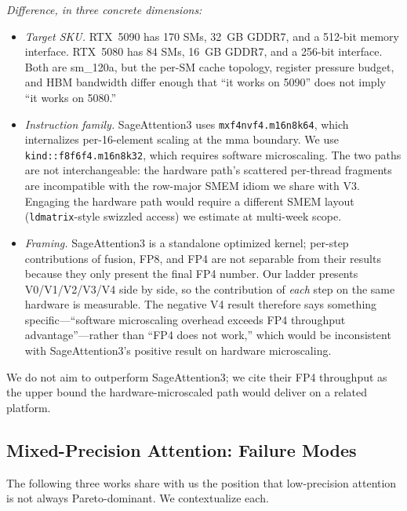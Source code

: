 \documentclass[conference]{IEEEtran}
\begin{document}
\emph{Difference, in three concrete dimensions:}
\begin{itemize}
  \item \emph{Target SKU.} RTX~5090 has 170 SMs, 32~GB GDDR7, and a
        512-bit memory interface. RTX~5080 has 84 SMs, 16~GB GDDR7,
        and a 256-bit interface. Both are sm\_120a, but the per-SM
        cache topology, register pressure budget, and HBM bandwidth
        differ enough that ``it works on 5090'' does not imply
        ``it works on 5080.''
  \item \emph{Instruction family.} SageAttention3 uses
        \texttt{mxf4nvf4.m16n8k64}, which internalizes per-16-element
        scaling at the mma boundary. We use
        \texttt{kind::f8f6f4.m16n8k32}, which requires software
        microscaling. The two paths are not interchangeable: the
        hardware path's scattered per-thread fragments are
        incompatible with the row-major SMEM idiom we share with V3.
        Engaging the hardware path would require a different SMEM
        layout (\texttt{ldmatrix}-style swizzled access) we estimate
        at multi-week scope.
  \item \emph{Framing.} SageAttention3 is a standalone optimized
        kernel; per-step contributions of fusion, FP8, and FP4 are
        not separable from their results because they only present
        the final FP4 number. Our ladder presents V0/V1/V2/V3/V4
        side by side, so the contribution of \emph{each} step on
        the same hardware is measurable. The negative V4 result
        therefore says something specific---``software microscaling
        overhead exceeds FP4 throughput advantage''---rather than
        ``FP4 does not work,'' which would be inconsistent with
        SageAttention3's positive result on hardware microscaling.
\end{itemize}

We do not aim to outperform SageAttention3; we cite their FP4
throughput as the upper bound the hardware-microscaled path would
deliver on a related platform.

\subsection{Mixed-Precision Attention: Failure Modes}

The following three works share with us the position that
low-precision attention is not always Pareto-dominant. We
contextualize each.
\end{document}
